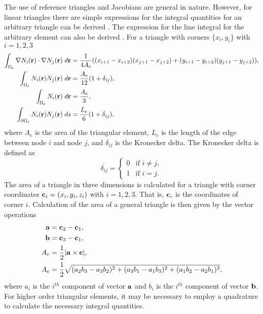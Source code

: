       The use of reference triangles and Jacobians are general in nature.
      However, for linear triangles there are simple expressions
      for the integral quantities for an arbitrary triangle can be derived
      \cite{textbookwhite}. The expression for
      the line integral for the arbitrary element can also be derived
      \cite{computerLab}. For a triangle with 
      corners $\{ x_i,y_i \}$ with $i=1,2,3$
      \begin{align}
        \int_{\Omega_e} \mathbf{\nabla} N_i(\mathbf{r}) \cdot \mathbf{\nabla} N_j(\mathbf{r}) 
          \;d\mathbf{r} &= \frac{1}{4 A_e}
          ((x_{i+1}-x_{i+2})(x_{j+1}-x_{j+2}) + 
          (y_{i+1}-y_{i+2})(y_{j+1}-y_{j+2})), \\
        \int_{\Omega_e} N_i(\mathbf{r}) N_j(\mathbf{r}) \;d\mathbf{r} &= 
          \frac{A_e}{12} (1+\delta_{ij}), \\
        \int_{\Omega_e} N_i(\mathbf{r}) \;d\mathbf{r} &= \frac{A_e}{3}, \\
        \int_{\partial \Omega_e} N_i(\mathbf{r}) N_j(\mathbf{r}) \;ds &=
          \frac{L_e}{6}(1+\delta_{ij}), 
      \end{align}
      where $A_e$ is the area of the triangular element, $L_e$ is the length of 
      the edge between node $i$ and node $j$, and $\delta_{ij}$ is the Kronecker
      delta.
      The Kronecker delta is defined as
      \begin{equation} \label{eq:kroneker_delta}
        \delta_{ij} =
        \begin{cases}
          0 & \text{if } i \ne j, \\
          1 & \text{if } i = j.
        \end{cases}
      \end{equation}
      The area of a triangle in three dimensions is calculated for a triangle
      with corner coordinates $\mathbf{c}_i = (x_i, y_i, z_i)$ with $i=1,2,3$.
      That is, $\mathbf{c}_i$ is the coordinates of corner $i$. Calculation of the area
      of a general triangle is then given by the vector operations
      \begin{align}
        \mathbf{a} &= \mathbf{c}_2 - \mathbf{c}_1, \\
        \mathbf{b} &= \mathbf{c}_3 - \mathbf{c}_1, \\
        A_e &= \frac{1}{2} \lvert \mathbf{a} \times \mathbf{c} \rvert, \\
        \label{eq:area_triangle}
        A_e &= \frac{1}{2} \sqrt{ (a_2 b_3 - a_3 b_2)^2 + (a_3 b_1 - a_1 b_3)^2 +
          (a_1 b_2 - a_2 b_1)^2},
      \end{align}
      where $a_i$ is the $i^{th}$ component of vector $\mathbf{a}$ and $b_i$ is the
      $i^{th}$ component of vector $\mathbf{b}$.
      For higher order triangular elements, it may be necessary to employ a 
      quadrature to calculate the necessary integral quantities.

